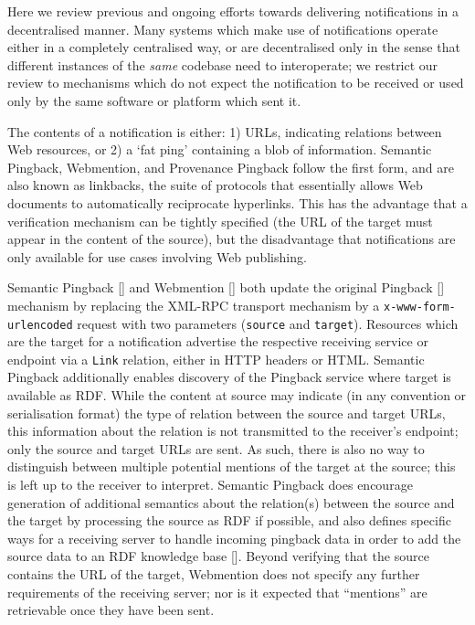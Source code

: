                         
                            
\par Here we review previous and ongoing efforts towards delivering notifications in a decentralised manner. Many systems which make use of notifications operate either in a completely centralised way, or are decentralised only in the sense that different instances of the {\em same} codebase need to interoperate; we restrict our review to mechanisms which do not expect the notification to be received or used only by the same software or platform which sent it.

                            
\par The contents of a notification is either: 1) URLs, indicating relations between Web resources, or 2) a ‘fat ping’ containing a blob of information. Semantic Pingback, Webmention, and Provenance Pingback follow the first form, and are also known as linkbacks, the suite of protocols that essentially allows Web documents to automatically reciprocate hyperlinks. This has the advantage that a verification mechanism can be tightly specified (the URL of the target must appear in the content of the source), but the disadvantage that notifications are only available for use cases involving Web publishing.

                            
\par \empty Semantic Pingback [] and \empty Webmention [] both update the original \empty Pingback [] mechanism by replacing the XML-RPC transport mechanism by a {\tt x-www-form-urlencoded} request with two parameters ({\tt source} and {\tt target}). Resources which are the target for a notification advertise the respective receiving service or endpoint via a {\tt Link} relation, either in HTTP headers or HTML. Semantic Pingback additionally enables discovery of the Pingback service where target is available as RDF. While the content at source may indicate (in any convention or serialisation format) the type of relation between the source and target URLs, this information about the relation is not transmitted to the receiver’s endpoint; only the source and target URLs are sent. As such, there is also no way to distinguish between multiple potential mentions of the target at the source; this is left up to the receiver to interpret. Semantic Pingback does encourage generation of additional semantics about the relation(s) between the source and the target by processing the source as RDF if possible, and also defines specific ways for a receiving server to handle incoming pingback data in order to add the source data to an RDF knowledge base []. Beyond verifying that the source contains the URL of the target, Webmention does not specify any further requirements of the receiving server; nor is it expected that “mentions” are retrievable once they have been sent. 

